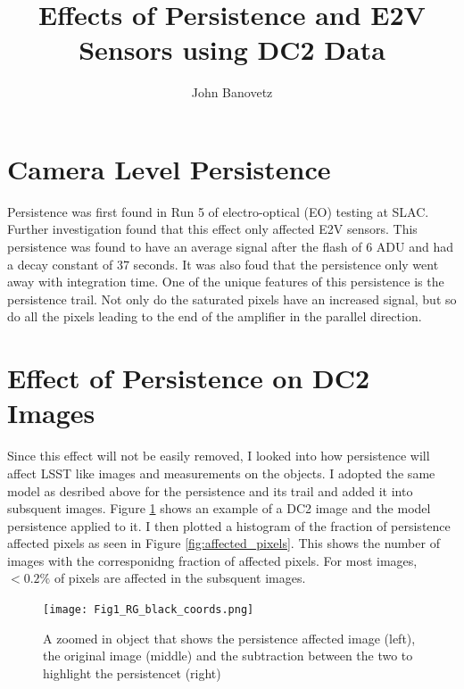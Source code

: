\documentclass[DM,authoryear,toc]{lsstdoc}
\title{Effects of Persistence and E2V Sensors using DC2 Data}
\author{%
John Banovetz
}
\date{\vcsDate}
\begin{document}
\maketitle


\section{Camera Level Persistence}
Persistence was first found in Run 5 of electro-optical (EO) testing at SLAC. Further investigation found that this effect only affected E2V sensors. 
This persistence was found to have an average signal after the flash of 6 ADU and had a decay constant of 37 seconds. 
It was also foud that the persistence only went away with integration time. One of the unique features of this persistence is the persistence trail. 
Not only do the saturated pixels have an increased signal, but so do all the pixels leading to the end of the amplifier in the parallel direction.


\section{Effect of Persistence on DC2 Images}

Since this effect will not be easily removed, I looked into how persistence will affect LSST like images and measurements on the objects. 
I adopted the same model as desribed above for the persistence and its trail and added it into subsquent images. 
Figure \ref{fig:ex_persistence} shows an example of a DC2 image and the model persistence applied to it. 
I then plotted a histogram of the fraction of persistence affected pixels as seen in Figure \ref{fig:affected_pixels}. 
This shows the number of images with the corresponidng fraction of affected pixels. 
For most images, $<0.2\%$ of pixels are affected in the subsquent images.


\begin{figure}[!htp]
  \centering
  \texttt{[image: Fig1\_RG\_black\_coords.png]}
  \caption{
  A zoomed in object that shows the persistence affected image (left), the original image (middle) 
  and the subtraction between the two to highlight the persistencet (right)
  }
  \label{fig:ex_persistence}
\end{figure}
\end{document}
